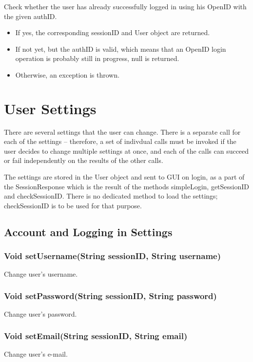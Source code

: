 Check whether the user has already successfully logged in using his OpenID with the given authID.

\begin{itemize}
\item If yes, the corresponding sessionID and User object are returned.
\item If not yet, but the authID is valid, which means that an OpenID login operation is probably still in progress, null is returned.
\item Otherwise, an exception is thrown.
\end{itemize}

\section{User Settings}

There are several settings that the user can change. There is a separate call for each of the settings -- therefore, a set of indivdual calls must be invoked if the user decides to change multiple settings at once, and each of the calls can succeed or fail independently on the results of the other calls.

The settings are stored in the User object and sent to GUI on login, as a part of the SessionResponse which is the result of the methods simpleLogin, getSessionID and checkSessionID. There is no dedicated method to load the settings; checkSessionID is to be used for that purpose.

\subsection{Account and Logging in Settings}

\subsubsection{Void setUsername(String sessionID, String username)}
Change user's username.

\subsubsection{Void setPassword(String sessionID, String password)}
Change user's password.

\subsubsection{Void setEmail(String sessionID, String email)}
Change user's e-mail.

